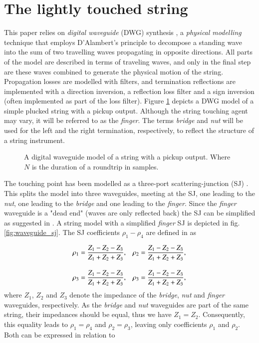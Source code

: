 \documentclass{sigchi}
\begin{document}
\section{The lightly touched string}

This paper relies on \textit{digital waveguide} (DWG) synthesis \cite{smith_physical_1992}, a \textit{physical modelling} technique that employs D'Alambert's principle to decompose a standing wave into the sum of two travelling waves propagating in opposite directions. All parts of the model are described in terms of traveling waves, and only in the final step are these waves combined to generate the physical motion of the string. Propagation losses are modelled with filters, and termination reflections are implemented with a direction inversion, a reflection loss filter and a sign inversion (often implemented as part of the loss filter). Figure \ref{fig:pickup} depicts a DWG model of a simple plucked string with a pickup output. Although the string touching agent may vary, it will be referred to as the \textit{finger}. The terms \textit{bridge} and \textit{nut} will be used for the left and the right termination, respectively, to reflect the structure of a string instrument.

\begin{figure}[h]
	\centering
	\scalebox{0.75}{}
	\caption{A digital waveguide model of a string with a pickup output. Where $N$ is the duration of a roundtrip in samples.}
	\label{fig:pickup}
\end{figure}

The touching point has been modelled as a three-port scattering-junction (SJ) \cite{scavone_digital_1997, valimaki_modeling_1993}. This splits the model into three waveguides, meeting at the SJ, one leading to the \textit{nut}, one leading to the \textit{bridge} and one leading to the \textit{finger}. Since the \textit{finger} waveguide is a "dead end" (waves are only reflected back) the SJ can be simplified as suggested in \cite{pakarinen_physical_2005}. A string model with a simplified \textit{finger} SJ is depicted in fig. \ref{fig:waveguide_sj}. The SJ coefficients $\rho_1 - \rho_4$ are defined in \cite{pakarinen_physical_2005} as

\begin{align} \label{eq:coef}
	\rho_1& = \frac{Z_1-Z_2-Z_3}{Z_1+Z_2+Z_3},&
	\rho_2& = \frac{Z_1-Z_2-Z_3}{Z_1+Z_2+Z_3},\notag\\[1em]
	\rho_3& = \frac{Z_1-Z_2-Z_3}{Z_1+Z_2+Z_3},&
	\rho_3& = \frac{Z_1-Z_2-Z_3}{Z_1+Z_2+Z_3},
\end{align}
where $Z_1$, $Z_2$ and $Z_3$ denote the impedance of the \textit{bridge}, \textit{nut} and \textit{finger} waveguides, respectively. As the \textit{bridge} and \textit{nut} waveguides are part of the same string, their impedances should be equal, thus we have $Z_1=Z_2$. Consequently, this equality leads to $\rho_1=\rho_4$ and $\rho_2=\rho_3$, leaving only coefficients $\rho_1$ and $\rho_2$. Both can be expressed in relation to
\end{document}
